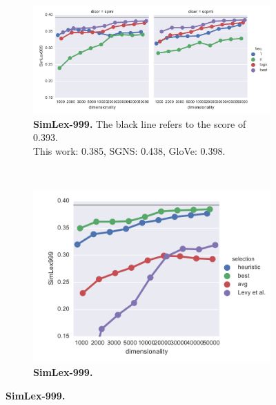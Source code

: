 \begin{figure}
  \centering
  \begin{subfigure}[t]{0.6\textwidth}
    \includegraphics[width=\textwidth]{supplement/figures/SimLex999-best}
    \caption{\textbf{SimLex-999.} The black line refers to the score of 0.393. \\
      This work: 0.385,
      SGNS: 0.438,
      GloVe: 0.398.
    }
    \label{fig:best-simlex}
  \end{subfigure}
  ~
  \begin{subfigure}[t]{0.37\textwidth}
    \includegraphics[width=\textwidth]{supplement/figures/SimLex999-global-best}
    \caption{\textbf{SimLex-999.}
    }
    \label{fig:global-best-simlex}
  \end{subfigure}


\end{figure}

